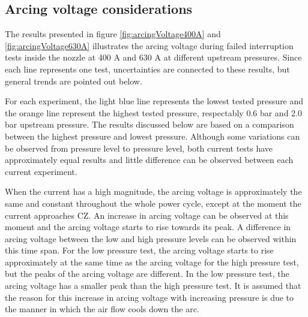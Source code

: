 \documentclass[10pt,a4paper,twoside]{article}
\begin{document}
\subsection{Arcing voltage considerations}
The results presented in figure \ref{fig:arcingVoltage400A} and \ref{fig:arcingVoltage630A} illustrates the arcing voltage during failed interruption tests inside the nozzle at 400 A and 630 A at different upstream pressures. Since each line represents one test, uncertainties are connected to these results, but general trends are pointed out below.

For each experiment, the light blue line represents the lowest tested pressure and the orange line represent the highest tested pressure, respectably 0.6 bar and 2.0 bar upstream pressure. The results discussed below are based on a comparison between the highest pressure and lowest pressure. Although some variations can be observed from pressure level to pressure level, both current tests have approximately equal results and little difference can be observed between each current experiment.

When the current has a high magnitude, the arcing voltage is approximately the same and constant throughout the whole power cycle, except at the moment the current approaches CZ. An increase in arcing voltage can be observed at this moment and the arcing voltage starts to rise towards its peak. A difference in arcing voltage between the low and high pressure levels can be observed within this time span. For the low pressure test, the arcing voltage starts to rise approximately at the same time as the arcing voltage for the high pressure test, but the peaks of the arcing voltage are different. In the low pressure test, the arcing voltage has a smaller peak than the high pressure test. It is assumed that the reason for this increase in arcing voltage with increasing pressure is due to the manner in which the air flow cools down the arc.
\end{document}
